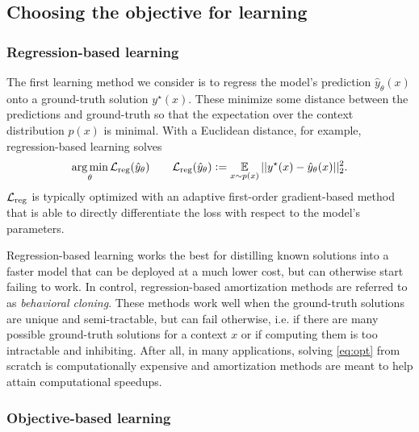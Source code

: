 \documentclass[twoside,11pt]{article}
\newcommand{\ie}{i.e.\xspace}
\begin{document}
\subsection{Choosing the objective for learning}
\subsubsection{Regression-based learning}
\label{sec:learning:reg}
The first learning method we consider is to regress the
model's prediction $\hat y_\theta(x)$ onto a
ground-truth solution $y^\star(x)$.
These minimize some distance between the predictions
and ground-truth so that the expectation over
the context distribution $p(x)$ is minimal.
With a Euclidean distance, for example,
regression-based learning solves
\begin{equation}
  \operatorname*{arg\,min}_\theta {\mathcal{L}}_{\rm reg}(\hat y_\theta) \qquad
  {\mathcal{L}}_{\rm reg}(\hat y_\theta) \vcentcolon=
  \operatorname*{\mathbb{E}}_{x \sim p(x)} ||y^\star(x) - \hat y_\theta(x)||_2^2.
\label{eq:reg-loss}
\end{equation}
${\mathcal{L}}_{\rm reg}$ is typically optimized with an adaptive first-order
gradient-based method that is able to directly differentiate
the loss with respect to the model's parameters.

Regression-based learning works the best for distilling
known solutions into a faster model that can be deployed
at a much lower cost, but can otherwise start failing to work.
In control, regression-based amortization
methods are referred to as \emph{behavioral cloning}.
These methods work well when the ground-truth solutions
are unique and semi-tractable, but can fail otherwise,
\ie if there are many possible ground-truth
solutions for a context $x$ or if computing them
is too intractable and inhibiting.
After all, in many applications, solving \cref{eq:opt}
from scratch is computationally expensive and
amortization methods are meant to help attain
computational speedups.

\subsubsection{Objective-based learning}
\label{sec:learning:grad}
\end{document}
